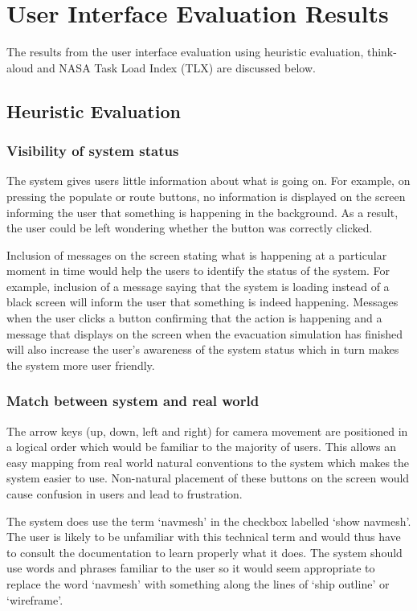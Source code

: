 \section{User Interface Evaluation Results}
\label{results}

The results from the user interface evaluation using heuristic evaluation, think-aloud and NASA Task Load Index (TLX) are discussed below.

\subsection{Heuristic Evaluation}
\subsubsection{Visibility of system status}
The system gives users little information about what is going on. For example, on pressing the populate or route buttons, no information is displayed on the screen informing the user that something is happening in the background. As a result, the user could be left wondering whether the button was correctly clicked.

Inclusion of messages on the screen stating what is happening at a particular moment in time would help the users to identify the status of the system. For example, inclusion of a message saying that the system is loading instead of a black screen will inform the user that something is indeed happening. Messages when the user clicks a button confirming that the action is happening and a message that displays on the screen when the evacuation simulation has finished will also increase the user’s awareness of the system status which in turn makes the system more user friendly.

\subsubsection{Match between system and real world}
The arrow keys (up, down, left and right) for camera movement are positioned in a logical order which would be familiar to the majority of users. This allows an easy mapping from real world natural conventions to the system which makes the system easier to use. Non-natural placement of these buttons on the screen would cause confusion in users and lead to frustration.

The system does use the term `navmesh' in the checkbox labelled `show navmesh'. The user is likely to be unfamiliar with this technical term and would thus have to consult the documentation to learn properly what it does. The system should use words and phrases familiar to the user so it would seem appropriate to replace the word `navmesh' with something along the lines of `ship outline' or `wireframe'.

